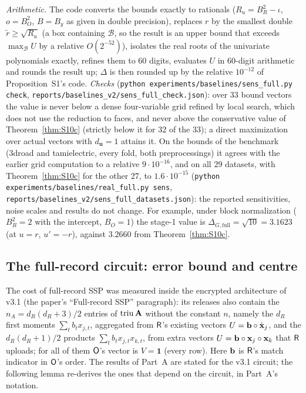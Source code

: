 \emph{Arithmetic.} The code converts the bounds exactly to rationals ($R_u=B_R^2-\iota$, $o=B_O^2$, $B=B_y$ as given in double precision), replaces $r$ by the smallest double $\tilde r\ge\sqrt{R_u}$ (a box containing $\mathcal B$, so the result is an upper bound that exceeds $\max_{\mathcal B}U$ by a relative $O(2^{-52})$), isolates the real roots of the univariate polynomials exactly, refines them to $60$ digits, evaluates $U$ in $60$-digit arithmetic and rounds the result up; $\Delta$ is then rounded up by the relative $10^{-12}$ of Proposition~S1's code. \emph{Checks} (\texttt{python experiments/baselines/sens\_full.py check}, \texttt{reports/baselines\_v2/sens\_full\_check.json}): over $33$ bound vectors the value is never below a dense four-variable grid refined by local search, which does not use the reduction to faces, and never above the conservative value of Theorem~\ref{thm:S10c} (strictly below it for $32$ of the $33$); a direct maximization over actual vectors with $d_{\mathbf u}=1$ attains it. On the bounds of the benchmark (3droad and tamielectric, every fold, both preprocessings) it agrees with the earlier grid computation to a relative $9\cdot10^{-16}$, and on all 29 datasets, with Theorem~\ref{thm:S10c} for the other 27, to $1.6\cdot10^{-15}$ (\texttt{python experiments/baselines/real\_full.py sens}, \texttt{reports/baselines\_v2/sens\_full\_datasets.json}): the reported sensitivities, noise scales and results do not change. For example, under block normalization ($B_R^2=2$ with the intercept, $B_O=1$) the stage-1 value is $\Delta_{G,\mathrm{full}}=\sqrt{10}=3.1623$ (at $u=r$, $u'=-r$), against $3.2660$ from Theorem~\ref{thm:S10c}.

\subsection{The full-record circuit: error bound and centre}

The cost of full-record SSP was measured inside the encrypted architecture of v3.1 (the paper's ``Full-record SSP'' paragraph): its releases also contain the $n_A=d_R(d_R+3)/2$ entries of $\operatorname{triu}\mathbf{A}$ without the constant $n$, namely the $d_R$ first moments $\sum_tb_tx_{j,t}$, aggregated from $\mathsf{R}$'s existing vectors $U=\mathbf{b}\circ\dot{\mathbf{x}}_j$, and the $d_R(d_R+1)/2$ products $\sum_tb_tx_{j,t}x_{k,t}$, from extra vectors $U=\mathbf{b}\circ\mathbf{x}_j\circ\mathbf{x}_k$ that $\mathsf{R}$ uploads; for all of them $\mathsf{O}$'s vector is $V=\mathbf 1$ (every row). Here $\mathbf{b}$ is $\mathsf{R}$'s match indicator in $\mathsf{O}$'s order. The results of Part~A are stated for the v3.1 circuit; the following lemma re-derives the ones that depend on the circuit, in Part~A's notation.

